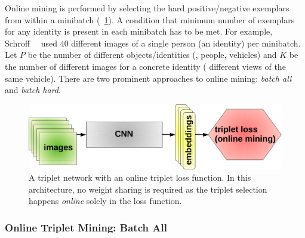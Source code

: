 Online mining is performed by selecting the hard positive/negative exemplars from within a minibatch (\figtext{}~\ref{fig:TripletArchitectureOnlineMining}). A condition that minimum number of exemplars for any identity is present in each minibatch has to be met. For example, Schroff~\etal{}~\cite{schroff2015facenet} used $40$ different images of a single person (an identity) per minibatch. Let $P$ be the number of different objects/identities (\egtext{}, people, vehicles) and $K$ be the number of different images for a concrete identity (\egtext{} different views of the same vehicle). There are two prominent approaches to online mining: \emph{batch all} and \emph{batch hard}.

\begin{figure}[t]
    \centerline{\includegraphics[width=0.5\linewidth]{figures/theoretical_foundations/triplet_architecture_online_mining.pdf}}
    \caption[Triplet loss online mining architecture]{A triplet network with an online triplet loss function. In this architecture, no weight sharing is required as the triplet selection happens \emph{online} solely in the loss function.}
    \label{fig:TripletArchitectureOnlineMining}
\end{figure}

\subsubsection{Online Triplet Mining: Batch All}

